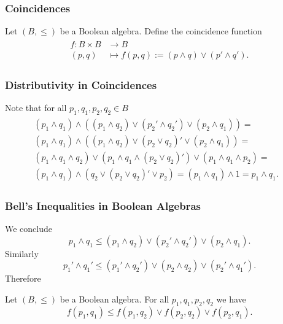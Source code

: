 \documentclass{beamer}
\begin{document}
\begin{frame}

	\frametitle{Coincidences}
	
	Let $(B,\leq)$ be a Boolean algebra. Define the coincidence function
	\begin{align}
	\begin{split}
		f:B\times B&\rightarrow B\\
		(p,q)&\mapsto f(p,q):=(p\wedge q)\vee(p'\wedge q').
	\end{split}
	\end{align}
	
\end{frame}

\begin{frame}

	\frametitle{Distributivity in Coincidences}

	Note that for all $p_1,q_1,p_2,q_2\in B$
	\begin{align}
	\begin{split}
		(p_1\wedge q_1)\wedge((p_1\wedge q_2)\vee(p_2'\wedge q_2')\vee(p_2\wedge q_1))=&\\
		(p_1\wedge q_1)\wedge((p_1\wedge q_2)\vee(p_2\vee q_2)'\vee(p_2\wedge q_1))=&\\
		(p_1\wedge q_1\wedge q_2)\vee(p_1\wedge q_1\wedge (p_2\vee q_2)')\vee(p_1\wedge q_1\wedge p_2)=&\\
		(p_1\wedge q_1)\wedge(q_2\vee(p_2\vee q_2)'\vee p_2)=(p_1\wedge q_1)\wedge 1=p_1\wedge q_1.&
	\end{split}
	\end{align}

\end{frame}
	
\begin{frame}
	
	\frametitle{Bell's Inequalities in Boolean Algebras}
	
	We conclude
	\begin{equation}
		p_1\wedge q_1\leq(p_1\wedge q_2)\vee(p_2'\wedge q_2')\vee(p_2\wedge q_1). 
	\end{equation}	
	Similarly
	\begin{equation}
		p_1'\wedge q_1'\leq(p_1'\wedge q_2')\vee(p_2\wedge q_2)\vee(p_2'\wedge q_1').
	\end{equation}
	Therefore
	\begin{theorem}
	
		Let $(B,\leq)$ be a Boolean algebra. For all $p_1,q_1,p_2,q_2$ we have
		\begin{equation}
			f(p_1,q_1)\leq f(p_1,q_2)\vee f(p_2,q_2)\vee f(p_2,q_1).
		\end{equation}			
	
	\end{theorem}
	
\end{frame}		
\end{document}
